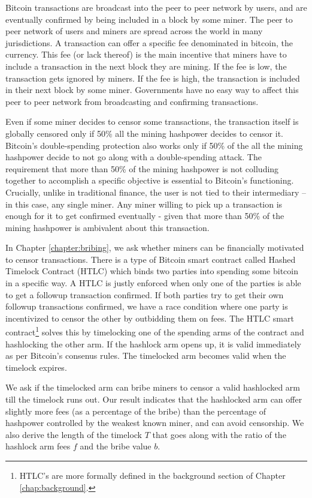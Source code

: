 Bitcoin transactions are broadcast into the peer to peer network by users, and are eventually confirmed by being included in a block by some miner. The peer to peer network of users and miners are spread across the world in many jurisdictions. A transaction can offer a specific fee denominated in bitcoin, the currency. This fee (or lack thereof) is the main incentive that miners have to include a transaction in the next block they are mining. If the fee is low, the transaction gets ignored by miners. If the fee is high, the transaction is included in their next block by some miner. Governments have no easy way to affect this peer to peer network from broadcasting and confirming transactions.

Even if some miner decides to censor some transactions, the transaction itself is globally censored only if 50\% all the mining hashpower decides to censor it. Bitcoin's double-spending protection also works only if 50\% of the all the mining hashpower decide to not go along with a double-spending attack. The requirement that more than 50\% of the mining hashpower is not colluding together to accomplish a specific objective is essential to Bitcoin's functioning. Crucially, unlike in traditional finance, the user is not tied to their intermediary -- in this case, any single miner. Any miner willing to pick up a transaction is enough for it to get confirmed eventually - given that more than 50\% of the mining hashpower is ambivalent about this transaction.

In Chapter \ref{chapter:bribing}, we ask whether miners can be financially motivated to censor transactions. There is a type of Bitcoin smart contract called Hashed Timelock Contract (HTLC) which binds two parties into spending some bitcoin in a specific way. A HTLC is justly enforced when only one of the parties is able to get a followup transaction confirmed. If both parties try to get their own followup transactions confirmed, we have a race condition where one party is incentivized to censor the other by outbidding them on fees. The HTLC smart contract\footnote{HTLC's are more formally defined in the background section of Chapter \ref{chap:background}.} solves this by timelocking one of the spending arms of the contract and hashlocking the other arm. If the hashlock arm opens up, it is valid immediately as per Bitcoin's consenus rules. The timelocked arm becomes valid when the timelock expires. 

We ask if the timelocked arm can bribe miners to censor a valid hashlocked arm till the timelock runs out. Our result indicates that the hashlocked arm can offer slightly more fees (as a percentage of the bribe) than the percentage of hashpower controlled by the weakest known miner, and can avoid censorship. We also derive the length of the timelock $T$ that goes along with the ratio of the hashlock arm fees $f$ and the bribe value $b$.

